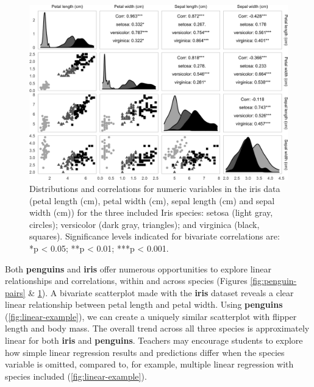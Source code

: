 \begin{Schunk}
\begin{figure}

{\centering \includegraphics[width=1\linewidth]{figs/iris-pairs-1} 

}

\caption[Distributions and correlations for numeric variables in the iris data (petal length (cm), petal width (cm), sepal length (cm) and sepal width (cm)) for the three included Iris species]{Distributions and correlations for numeric variables in the iris data (petal length (cm), petal width (cm), sepal length (cm) and sepal width (cm)) for the three included Iris species: setosa (light gray, circles); versicolor (dark gray, triangles); and virginica (black, squares). Significance levels indicated for bivariate correlations are: *p < 0.05; **p < 0.01; ***p < 0.001.}\label{fig:iris-pairs}
\end{figure}
\end{Schunk}

Both \textbf{penguins} and \textbf{iris} offer numerous opportunities to
explore linear relationships and correlations, within and across species
(Figures \ref{fig:penguin-pairs} \& \ref{fig:iris-pairs}). A bivariate
scatterplot made with the \textbf{iris} dataset reveals a clear linear
relationship between petal length and petal width. Using
\textbf{penguins} (\ref{fig:linear-example}), we can create a uniquely
similar scatterplot with flipper length and body mass. The overall trend
across all three species is approximately linear for both \textbf{iris}
and \textbf{penguins}. Teachers may encourage students to explore how
simple linear regression results and predictions differ when the species
variable is omitted, compared to, for example, multiple linear
regression with species included (\ref{fig:linear-example}).

